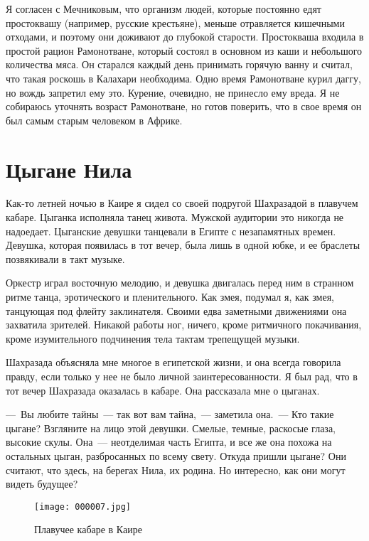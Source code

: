 \documentclass[12pt,a4paper,twoside,openany,svgnames]{memoir}
\begin{document}
Я согласен с Мечниковым, что организм людей, которые постоянно едят простоквашу (например, русские крестьяне), меньше отравляется кишечными отходами, и поэтому они доживают до глубокой старости. Простокваша входила в простой рацион Рамонотване, который состоял в основном из каши и небольшого количества мяса. Он старался каждый день принимать горячую ванну и считал, что такая роскошь в Калахари необходима. Одно время Рамонотване курил даггу, но вождь запретил ему это. Курение, очевидно, не принесло ему вреда. Я не собираюсь уточнять возраст Рамонотване, но готов поверить, что в свое время он был самым старым человеком в Африке.

\chapter{Цыгане Нила}

Как-то летней ночью в Каире я сидел со своей подругой Шахразадой в плавучем кабаре. Цыганка исполняла танец живота. Мужской аудитории это никогда не надоедает. Цыганские девушки танцевали в Египте с незапамятных времен. Девушка, которая появилась в тот вечер, была лишь в одной юбке, и ее браслеты позвякивали в такт музыке.

Оркестр играл восточную мелодию, и девушка двигалась перед ним в странном ритме танца, эротического и пленительного. Как змея, подумал я, как змея, танцующая под флейту заклинателя. Своими едва заметными движениями она захватила зрителей. Никакой работы ног, ничего, кроме ритмичного покачивания, кроме изумительного подчинения тела тактам трепещущей музыки.

Шахразада объясняла мне многое в египетской жизни, и она всегда говорила правду, если только у нее не было личной заинтересованности. Я был рад, что в тот вечер Шахразада оказалась в кабаре. Она рассказала мне о цыганах.

---~Вы любите тайны~--- так вот вам тайна,~--- заметила она.~--- Кто такие цыгане? Взгляните на лицо этой девушки. Смелые, темные, раскосые глаза, высокие скулы. Она~--- неотделимая часть Египта, и все же она похожа на остальных цыган, разбросанных по всему свету. Откуда пришли цыгане? Они считают, что здесь, на берегах Нила, их родина. Но интересно, как они могут видеть будущее?

\begin{figure}[ht!]
\centering
\texttt{[image: 000007.jpg]}
\caption{Плавучее кабаре в Каире}
\label{overflow}
\end{figure}
\end{document}
